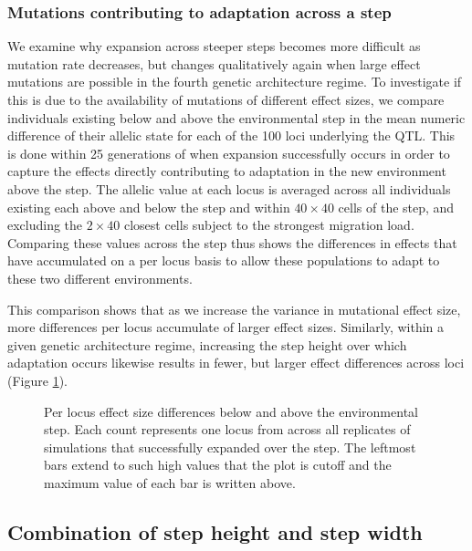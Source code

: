 \subsubsection{Mutations contributing to adaptation across a step}

We examine why expansion across steeper steps becomes more difficult as mutation rate decreases, but changes qualitatively again when large effect mutations are possible in the fourth genetic architecture regime. To investigate if this is due to the availability of mutations of different effect sizes, we compare individuals existing below and above the environmental step in the mean numeric difference of their allelic state for each of the 100 loci underlying the QTL. This is done within 25 generations of when expansion successfully occurs in order to capture the effects directly contributing to adaptation in the new environment above the step. The allelic value at each locus is averaged across all individuals existing each above and below the step and within $40\times40$ cells of the step, and excluding the $2\times40$ closest cells subject to the strongest migration load. Comparing these values across the step thus shows the differences in effects that have accumulated on a per locus basis to allow these populations to adapt to these two different environments.

This comparison shows that as we increase the variance in mutational effect size, more differences per locus accumulate of larger effect sizes. Similarly, within a given genetic architecture regime, increasing the step height over which adaptation occurs likewise results in fewer, but larger effect differences across loci (Figure \ref{fig:effectsizes}).



\begin{figure}[h]
\centering
{}
\caption[Per locus effect size differences.]{Per locus effect size differences below and above the environmental step. Each count represents one locus from across all replicates of simulations that successfully expanded over the step. The leftmost bars extend to such high values that the plot is cutoff and the maximum value of each bar is written above.}
\label{fig:effectsizes}
\end{figure}

\subsection{Combination of step height and step width}

